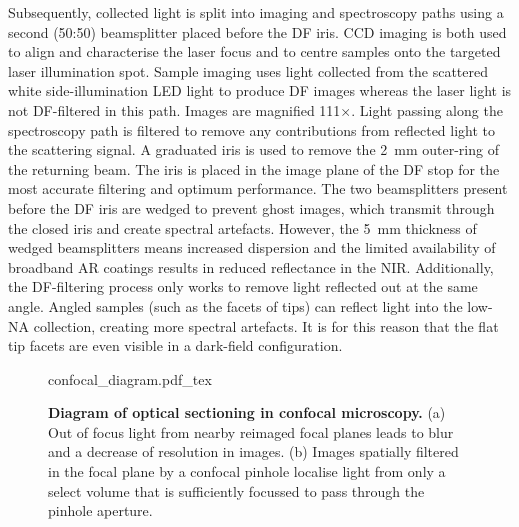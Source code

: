 \documentclass{article}
\begin{document}
Subsequently, collected light is split into imaging and spectroscopy paths using a second (50:50) beamsplitter placed before the DF iris. CCD imaging is both used to align and characterise the laser focus and to centre samples onto the targeted laser illumination spot. Sample imaging uses light collected from the scattered white side-illumination LED light to produce DF images whereas the laser light is not DF-filtered in this path. Images are magnified 111$\times$. Light passing along the spectroscopy path is filtered to remove any contributions from reflected light to the scattering signal. A graduated iris is used to remove the \SI{2}{mm} outer-ring of the returning beam. The iris is placed in the image plane of the DF stop for the most accurate filtering and optimum performance. The two beamsplitters present before the DF iris are wedged to prevent ghost images, which transmit through the closed iris and create spectral artefacts. However, the \SI{5}{mm} thickness of wedged beamsplitters means increased dispersion and the limited availability of broadband AR coatings results in reduced reflectance in the NIR. %
Additionally, the DF-filtering process only works to remove light reflected out at the same angle. Angled samples (such as the facets of tips) can reflect light into the low-NA collection, creating more spectral artefacts. It is for this reason that the flat tip facets are even visible in a dark-field configuration.

\begin{figure}[bt]
\centering
\fontsize{10pt}{1em}\selectfont
{confocal_diagram.pdf_tex}
\caption[Diagram of optical sectioning in confocal microscopy]{\textbf{Diagram of optical sectioning in confocal microscopy.} (a) Out of focus light from nearby reimaged focal planes leads to blur and a decrease of resolution in images. (b) Images spatially filtered in the focal plane by a confocal pinhole localise light from only a select volume that is sufficiently focussed to pass through the pinhole aperture.}
\label{fig:confocal_diagram}
\end{figure}
\end{document}
